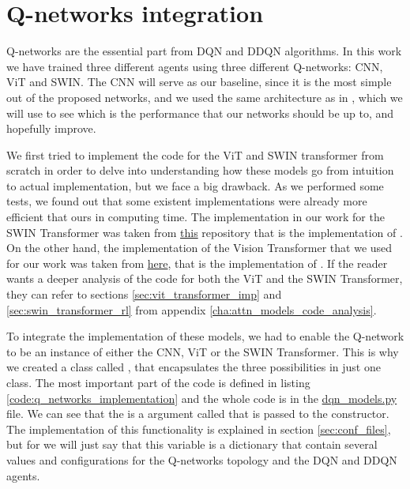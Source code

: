 \section{Q-networks integration}
Q-networks are the essential part from DQN and DDQN algorithms. In this work we have trained three different agents using three different Q-networks: CNN, ViT and SWIN. The CNN will serve as our baseline, since it is the most simple out of the proposed networks, and we used the same architecture as in \cite{mnih2013playing}, which we will use to see which is the performance that our networks should be up to, and hopefully improve.

We first tried to implement the code for the ViT and SWIN transformer from scratch in order to delve into understanding how these models go from intuition to actual implementation, but we face a big drawback.  As we performed some tests, we found out that some existent implementations were already more efficient that ours in computing time. The implementation in our work for the SWIN Transformer was taken from \href{https://github.com/microsoft/Swin-Transformer}{this} repository that is the implementation of \cite{liu2021swin}. On the other hand, the implementation of the Vision Transformer that we used for our work was taken from \href{https://github.com/facebookresearch/dino/blob/main/vision_transformer.py}{here}, that is the implementation of \cite{vit}. If the reader wants a deeper analysis of the code for both the ViT and the SWIN Transformer, they can refer to sections \ref{sec:vit_transformer_imp} and \ref{sec:swin_transformer_rl} from appendix \ref{cha:attn_models_code_analysis}.

To integrate the implementation of these models, we had to enable the Q-network to be an instance of either the CNN, ViT or the SWIN Transformer. This is why we created a class called , that encapsulates the three possibilities in just one class. The most important part of the code is defined in listing \ref{code:q_networks_implementation} and the whole code is in the \href{https://github.com/Javimh18/DL_TFM/blob/main/src/agents/dqn_models.py}{dqn\_models.py} file. We can see that the is a argument called  that is passed to the constructor. The implementation of this functionality is explained in section \ref{sec:conf_files}, but for we will just say that this variable is a dictionary that contain several values and configurations for the Q-networks topology and the DQN and DDQN agents. 

